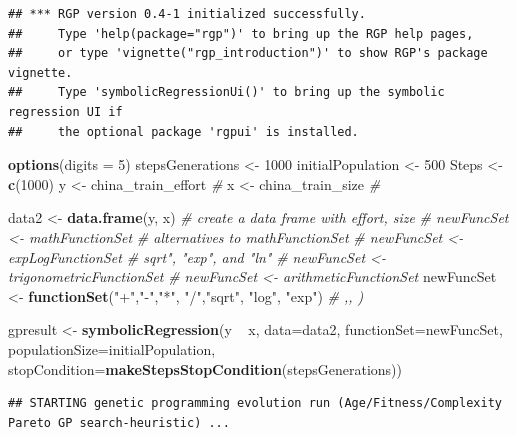 \documentclass[]{book}
\newenvironment{Shaded}{\begin{snugshade}}{\end{snugshade}}
\newcommand{\KeywordTok}[1]{\textcolor[rgb]{0.13,0.29,0.53}{\textbf{{#1}}}}
\newcommand{\DataTypeTok}[1]{\textcolor[rgb]{0.13,0.29,0.53}{{#1}}}
\newcommand{\DecValTok}[1]{\textcolor[rgb]{0.00,0.00,0.81}{{#1}}}
\newcommand{\StringTok}[1]{\textcolor[rgb]{0.31,0.60,0.02}{{#1}}}
\newcommand{\CommentTok}[1]{\textcolor[rgb]{0.56,0.35,0.01}{\textit{{#1}}}}
\newcommand{\NormalTok}[1]{{#1}}
\begin{document}
\begin{verbatim}
## *** RGP version 0.4-1 initialized successfully.
##     Type 'help(package="rgp")' to bring up the RGP help pages,
##     or type 'vignette("rgp_introduction")' to show RGP's package vignette.
##     Type 'symbolicRegressionUi()' to bring up the symbolic regression UI if
##     the optional package 'rgpui' is installed.
\end{verbatim}

\begin{Shaded}
\begin{Highlighting}[]
\KeywordTok{options}\NormalTok{(}\DataTypeTok{digits =} \DecValTok{5}\NormalTok{)}
\NormalTok{stepsGenerations <-}\StringTok{ }\DecValTok{1000}
\NormalTok{initialPopulation <-}\StringTok{ }\DecValTok{500}
\NormalTok{Steps <-}\StringTok{ }\KeywordTok{c}\NormalTok{(}\DecValTok{1000}\NormalTok{)}
\NormalTok{y <-}\StringTok{ }\NormalTok{china_train_effort   }\CommentTok{#}
\NormalTok{x <-}\StringTok{ }\NormalTok{china_train_size  }\CommentTok{# }

\NormalTok{data2 <-}\StringTok{ }\KeywordTok{data.frame}\NormalTok{(y, x)  }\CommentTok{# create a data frame with effort, size}
\CommentTok{# newFuncSet <- mathFunctionSet}
\CommentTok{# alternatives to mathFunctionSet}
\CommentTok{# newFuncSet <- expLogFunctionSet # sqrt", "exp", and "ln"}
\CommentTok{# newFuncSet <- trigonometricFunctionSet}
\CommentTok{# newFuncSet <- arithmeticFunctionSet}
\NormalTok{newFuncSet <-}\StringTok{ }\KeywordTok{functionSet}\NormalTok{(}\StringTok{"+"}\NormalTok{,}\StringTok{"-"}\NormalTok{,}\StringTok{"*"}\NormalTok{, }\StringTok{"/"}\NormalTok{,}\StringTok{"sqrt"}\NormalTok{, }\StringTok{"log"}\NormalTok{, }\StringTok{"exp"}\NormalTok{) }\CommentTok{# ,, )}

\NormalTok{gpresult <-}\StringTok{ }\KeywordTok{symbolicRegression}\NormalTok{(y ~}\StringTok{ }\NormalTok{x, }
                                \DataTypeTok{data=}\NormalTok{data2, }\DataTypeTok{functionSet=}\NormalTok{newFuncSet,}
                                \DataTypeTok{populationSize=}\NormalTok{initialPopulation,}
                                \DataTypeTok{stopCondition=}\KeywordTok{makeStepsStopCondition}\NormalTok{(stepsGenerations))}
\end{Highlighting}
\end{Shaded}

\begin{verbatim}
## STARTING genetic programming evolution run (Age/Fitness/Complexity Pareto GP search-heuristic) ...
\end{verbatim}
\end{document}

